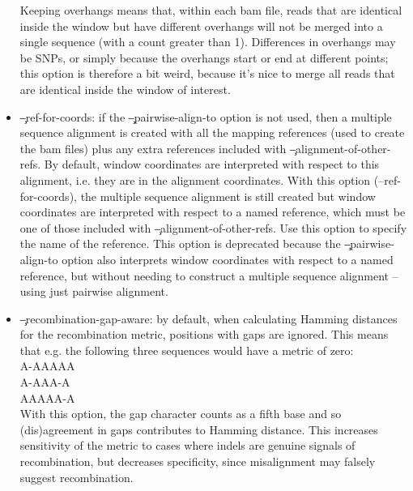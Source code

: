\begin{itemize}
Keeping overhangs means that, within each bam file, reads that are identical inside the window but have different overhangs will not be merged into a single sequence (with a count greater than 1).
Differences in overhangs may be SNPs, or simply because the overhangs start or end at different points; this
option is therefore a bit weird, because it's nice to merge all reads that are identical inside the window of interest.
\item \c{--ref-for-coords}: if the \c{--pairwise-align-to} option is not used, then a multiple sequence alignment is created with all the mapping references (used to create the bam files) plus any extra references included with \c{--alignment-of-other-refs}.
By default, window coordinates are interpreted with respect to this alignment, i.e. they are in the alignment
coordinates.
With this option (--ref-for-coords), the multiple sequence alignment is still created but window coordinates are interpreted with respect to a named reference, which must be one of those included with \c{--alignment-of-other-refs}.
Use this option to specify the name of the reference.
This option is deprecated because the \c{--pairwise-align-to} option also interprets window coordinates with respect to a named reference, but without needing to construct a multiple sequence alignment -- using just pairwise alignment.
\item \c{--recombination-gap-aware}: by default, when calculating Hamming distances for the recombination
metric, positions with gaps are ignored.
This means that e.g. the following three sequences would have a metric of zero:\\
{\ttfamily A-AAAAA\\
A-AAA-A\\
AAAAA-A}\\
With this option, the gap character counts as a fifth base and so (dis)agreement in gaps contributes to Hamming distance.
This increases sensitivity of the metric to cases where indels are genuine signals of recombination, but decreases specificity, since misalignment may falsely suggest recombination.
\end{itemize}





